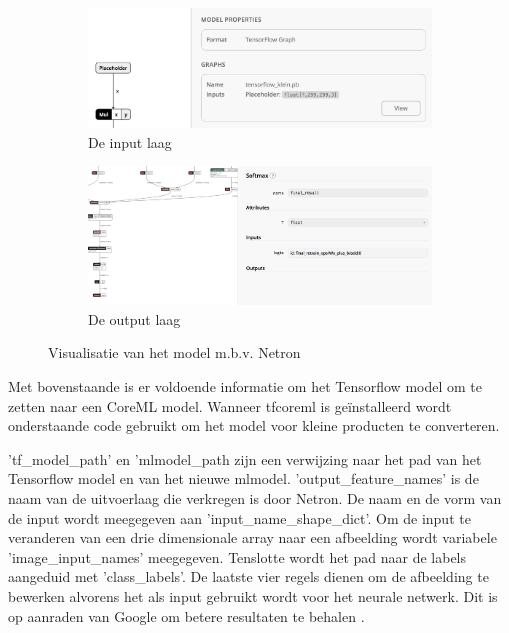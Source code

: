\begin{figure}[!ht]
    \centering
    \begin{subfigure}{.5\textwidth}
      \centering
      \includegraphics[width=.95\linewidth]{img/input_netron.png}
      \caption{De input laag}
      \label{fig:sub1}
    \end{subfigure}%
    \begin{subfigure}{.5\textwidth}
      \centering
      \includegraphics[width=.95\linewidth]{img/output_netron.png}
      \caption{De output laag}
      \label{fig:sub2}
    \end{subfigure}
    \caption{Visualisatie van het model m.b.v. Netron }
    \label{fig:visualisatienetron}
\end{figure}

Met bovenstaande is er voldoende informatie om het Tensorflow model om te zetten naar een CoreML model. Wanneer tfcoreml is geïnstalleerd wordt onderstaande code gebruikt om het model voor kleine producten te converteren. 


'tf\_model\_path' en 'mlmodel\_path zijn een verwijzing naar het pad van het Tensorflow model en van het nieuwe mlmodel. 'output\_feature\_names' is de naam van de uitvoerlaag die verkregen is door Netron. De naam en de vorm van de input wordt meegegeven aan 'input\_name\_shape\_dict'. Om de input te veranderen van een drie dimensionale array naar een afbeelding wordt variabele 'image\_input\_names' meegegeven. Tenslotte wordt het pad naar de labels aangeduid met 'class\_labels'. De laatste vier regels dienen om de afbeelding te bewerken alvorens het als input gebruikt wordt voor het neurale netwerk. Dit is op aanraden van Google om betere resultaten te behalen \autocite{hackermoon2}. 

